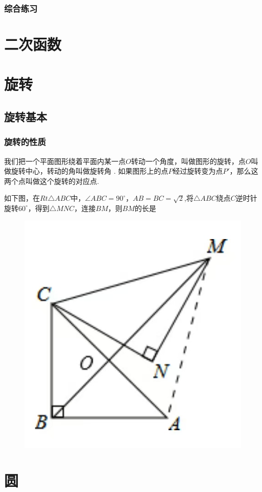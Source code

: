 \documentclass[lang=cn, 10pt, titlestyle=hang, oneside]{elegantbook}
\begin{document}
\subsection{综合练习}

\chapter{二次函数}

\chapter{旋转}

\section{旋转基本}

\subsection{旋转的性质}

我们把一个平面图形绕着平面内某一点\(O \)转动一个角度，叫做图形的旋转，点\(O \)叫做旋转中心，转动的角叫做旋转角 . 如果图形上的点\(P \)经过旋转变为点\(P' \)，那么这两个点叫做这个旋转的对应点.

\begin{example}
    如下图，在\(Rt\triangle ABC \)中，\(\angle ABC = 90^\circ \)，\(AB=BC=\sqrt{2}\),将\(\triangle ABC\)绕点\(C\)逆时针旋转\(60^\circ\)，得到\(\triangle MNC\)，连接\(BM\)，则\(BM\)的长是 \underline{\hspace{3em}}
    
\begin{figure}[h]
    \raggedright
    \includegraphics[width=0.25\linewidth]{figure/example_rotation1.jpg}
    
    \label{fig:enter-label}
\end{figure}
    
\end{example}



\chapter{圆}
\end{document}
